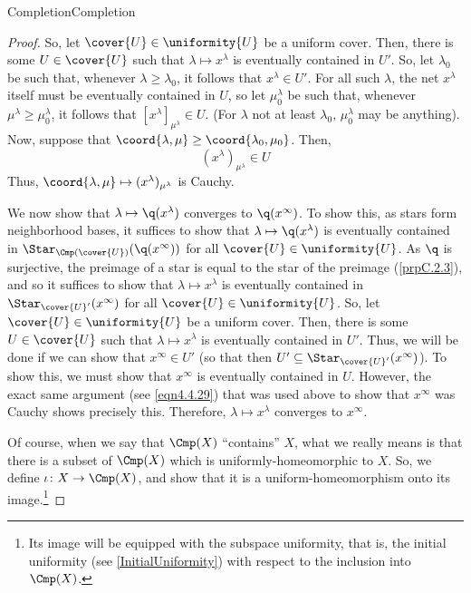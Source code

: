 \begin{thm}{Completion}{Completion}
\begin{proof}
So, let $\cover{U}\in \uniformity{U}$ be a uniform cover.  Then, there is some $U\in \cover{U}$ such that $\lambda \mapsto x^\lambda$ is eventually contained in $U'$.  So, let $\lambda _0$ be such that, whenever $\lambda \geq \lambda _0$, it follows that $x^\lambda \in U'$.  For all such $\lambda$, the net $x^\lambda$ itself must be eventually contained in $U$, so let $\mu _0^\lambda$ be such that, whenever $\mu ^\lambda \geq \mu _0^\lambda$, it follows that $[x^\lambda ]_{\mu ^\lambda}\in U$.  (For $\lambda$ not at least $\lambda _0$, $\mu _0^\lambda$ may be anything).  Now, suppose that $\coord{\lambda ,\mu}\geq \coord{\lambda _0,\mu _0}$.  Then,
\begin{equation}\label{eqn4.4.29}
(x^\lambda )_{\mu ^\lambda}\in U
\end{equation}
Thus, $\coord{\lambda ,\mu }\mapsto (x^\lambda )_{\mu ^\lambda}$ is Cauchy.

We now show that $\lambda \mapsto \q (x^\lambda )$ converges to $\q (x^\infty )$.  To show this, as stars form neighborhood bases, it suffices to show that $\lambda \mapsto \q (x^\lambda )$ is eventually contained in $\Star _{\Cmp (\cover{U})}(\q (x^\infty ))$ for all $\cover{U}\in \uniformity{U}$.  As $\q$ is surjective, the preimage of a star is equal to the star of the preimage (\cref{prpC.2.3}), and so it suffices to show that $\lambda \mapsto x^\lambda$ is eventually contained in $\Star _{\cover{U}'}(x^\infty )$ for all $\cover{U}\in \uniformity{U}$.  So, let $\cover{U}\in \uniformity{U}$ be a uniform cover.  Then, there is some $U\in \cover{U}$ such that $\lambda \mapsto x^\lambda$ is eventually contained in $U'$.  Thus, we will be done if we can show that $x^\infty \in U'$ (so that then $U'\subseteq \Star _{\cover{U}'}(x^\infty )$).  To show this, we must show that $x^\infty$ is eventually contained in $U$.  However, the exact same argument (see \eqref{eqn4.4.29}) that was used above to show that $x^\infty$ was Cauchy shows precisely this.  Therefore, $\lambda \mapsto x^\lambda$ converges to $x^\infty$.

Of course, when we say that $\Cmp (X)$ ``contains'' $X$, what we really means is that there is a subset of $\Cmp (X)$ which is uniformly-homeomorphic to $X$.  So, we define $\iota \colon X\rightarrow \Cmp (X)$, and show that it is a uniform-homeomorphism onto its image.\footnote{Its image will be equipped with the subspace uniformity, that is, the initial uniformity (see \cref{InitialUniformity}) with respect to the inclusion into $\Cmp (X)$.}


\end{proof}
\end{thm}
